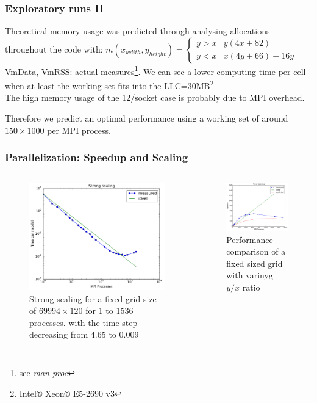 \documentclass{beamer}
\begin{document}
%
%
%
\begin{frame}
\frametitle{Exploratory runs II}

Theoretical memory usage was predicted through analysing allocations throughout the code with: $m(x_{wdith},y_{height})=\begin{cases}
y>x & y(4x+82)\\
y<x & x(4y+66)+16y\end{cases}$ \\
VmData, VmRSS: actual measures\footnote{see \emph{man proc}}. We can see a lower computing time per cell when at least the working set fits into the LLC=30MB\footnote{Intel® Xeon® E5-2690 v3}\\ The high memory usage of the 12/socket case is probably due to MPI overhead.
 
Therefore we predict an optimal performance using a working set of around $150\times1000$ per MPI process.

\end{frame}
%
%
%
\begin{frame}
\frametitle{Parallelization: Speedup and Scaling}
\begin{minipage}[1\textheight]{\textwidth}
\begin{columns}[T]
\begin{column}{0.5\textwidth}
\begin{figure}
\includegraphics[width=6.75cm]{strongscale.pdf}
\caption{Strong scaling for a fixed grid size of $69994\times 120$ for 1 to 1536 processes. with the time step decreasing from 4.65 to 0.009}
\end{figure}
\end{column}


\begin{column}{0.5\textwidth}
\begin{figure}
\includegraphics[width=6.75cm]{speedup.pdf}
\caption{Performance comparison of a fixed sized grid with varinyg $y/x$ ratio}
\end{figure}
\end{column}
\end{columns}
\end{minipage}
\end{frame}
\end{document}
